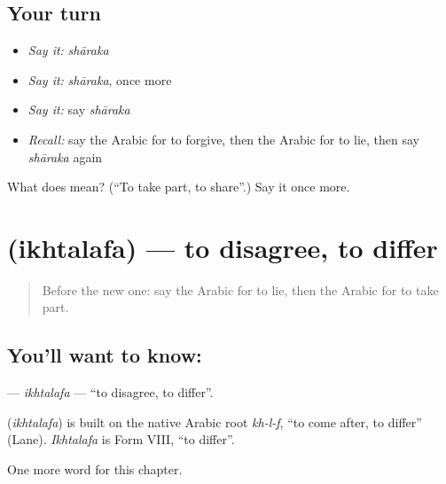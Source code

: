 \subsection*{Your turn}
\begin{itemize}
\raggedright
  \item \emph{Say it:} \emph{shāraka}
  \item \emph{Say it:} \emph{shāraka}, once more
  \item \emph{Say it:} say \emph{shāraka}
  \item \emph{Recall:} say the Arabic for to forgive, then the Arabic for to lie, then say \emph{shāraka} again
\end{itemize}

\begin{tcolorbox}[breakable,colback=teal!4,colframe=teal!35!black,title={Before you move on}]
What does  mean? (\textquotedblleft{}To take part, to share\textquotedblright{}.) Say it once more.
\end{tcolorbox}
\section[\texorpdfstring{\ar{اختلف} (ikhtalafa)}{اختلف (ikhtalafa)}]{ (ikhtalafa) — to disagree, to differ}

\label{lesson:AR-C258-ikhtalafa}



\begin{quote}
Before the new one: say the Arabic for to lie, then the Arabic for to take part.
\end{quote}

\subsection*{You'll want to know: }
\textbf{} — \emph{ikhtalafa} — \textquotedblleft{}to disagree, to differ\textquotedblright{}.

\begin{cousinweb}
\textbf{} (\emph{ikhtalafa}) is built on the native Arabic root \emph{kh-l-f}, \textquotedblleft{}to come after, to differ\textquotedblright{} (Lane). \emph{Ikhtalafa} is Form VIII, \textquotedblleft{}to differ\textquotedblright{}.
\end{cousinweb}

\begin{grammarlens}[title={What you've built}]
One more word for this chapter.
\end{grammarlens}


